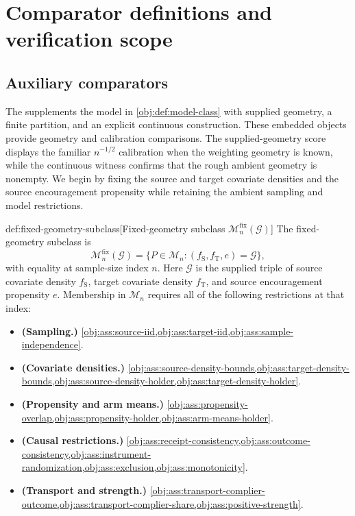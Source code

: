 \documentclass[11pt]{article}
\begin{document}
\section{Comparator definitions and verification scope}
\label{sec:verification-appendix}

\subsection{Auxiliary comparators}

The  supplements the model in \cref{obj:def:model-class} with supplied geometry, a finite partition, and an explicit continuous construction. These embedded objects provide geometry and calibration comparisons. The supplied-geometry score displays the familiar \(n^{-1/2}\) calibration when the weighting geometry is known, while the continuous witness confirms that the rough ambient geometry is nonempty. We begin by fixing the source and target covariate densities and the source encouragement propensity while retaining the ambient sampling and model restrictions.

\begin{definitionv}{def:fixed-geometry-subclass}[Fixed-geometry subclass $\mathcal M_n^{\mathrm{fix}}(\mathcal G)$]
The fixed-geometry subclass is
\[
\mathcal M_n^{\mathrm{fix}}(\mathcal G)
=
\bigl\{P\in\mathcal M_n:(f_{\mathrm S},f_{\mathrm T},e)=\mathcal G\bigr\},
\]
with equality at sample-size index \(n\). Here \(\mathcal G\) is the supplied triple of source covariate density \(f_{\mathrm S}\), target covariate density \(f_{\mathrm T}\), and source encouragement propensity \(e\). Membership in \(\mathcal M_n\) requires all of the following restrictions at that index:
\begin{itemize}
\item \textbf{(Sampling.)} \cref{obj:ass:source-iid,obj:ass:target-iid,obj:ass:sample-independence}.
\item \textbf{(Covariate densities.)} \cref{obj:ass:source-density-bounds,obj:ass:target-density-bounds,obj:ass:source-density-holder,obj:ass:target-density-holder}.
\item \textbf{(Propensity and arm means.)} \cref{obj:ass:propensity-overlap,obj:ass:propensity-holder,obj:ass:arm-means-holder}.
\item \textbf{(Causal restrictions.)} \cref{obj:ass:receipt-consistency,obj:ass:outcome-consistency,obj:ass:instrument-randomization,obj:ass:exclusion,obj:ass:monotonicity}.
\item \textbf{(Transport and strength.)} \cref{obj:ass:transport-complier-outcome,obj:ass:transport-complier-share,obj:ass:positive-strength}.
\end{itemize}
\end{definitionv}
\end{document}
